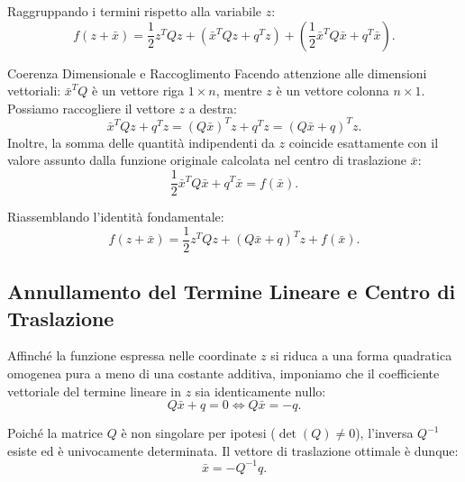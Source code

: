 Raggruppando i termini rispetto alla variabile $z$:
\begin{equation}
    f(z + \bar{x}) = \frac{1}{2} z^T Q z + \left( \bar{x}^T Q z + q^T z \right) + \left( \frac{1}{2} \bar{x}^T Q \bar{x} + q^T \bar{x} \right).
\end{equation}

\begin{noteblock}{Coerenza Dimensionale e Raccoglimento}
Facendo attenzione alle dimensioni vettoriali: $\bar{x}^T Q$ \`e un vettore riga $1 \times n$, mentre $z$ \`e un vettore colonna $n \times 1$. Possiamo raccogliere il vettore $z$ a destra:
\begin{equation}
    \bar{x}^T Q z + q^T z = (Q \bar{x})^T z + q^T z = (Q \bar{x} + q)^T z.
\end{equation}
Inoltre, la somma delle quantit\`a indipendenti da $z$ coincide esattamente con il valore assunto dalla funzione originale calcolata nel centro di traslazione $\bar{x}$:
\begin{equation}
    \frac{1}{2} \bar{x}^T Q \bar{x} + q^T \bar{x} = f(\bar{x}).
\end{equation}
\end{noteblock}

Riassemblando l'identit\`a fondamentale:
\begin{equation}
    f(z + \bar{x}) = \frac{1}{2} z^T Q z + (Q \bar{x} + q)^T z + f(\bar{x}).
    \label{eq:identita-traslazione-fondamentale}
\end{equation}

\subsection{Annullamento del Termine Lineare e Centro di Traslazione}
Affinch\'e la funzione espressa nelle coordinate $z$ si riduca a una forma quadratica omogenea pura a meno di una costante additiva, imponiamo che il coefficiente vettoriale del termine lineare in $z$ sia identicamente nullo:
\begin{equation}
    Q \bar{x} + q = 0 \iff Q \bar{x} = -q.
\end{equation}

Poich\'e la matrice $Q$ \`e non singolare per ipotesi ($\det(Q) \neq 0$), l'inversa $Q^{-1}$ esiste ed \`e univocamente determinata. Il vettore di traslazione ottimale \`e dunque:
\begin{equation}
    \bar{x} = -Q^{-1} q.
    \label{eq:centro-traslazione-ottimo}
\end{equation}

